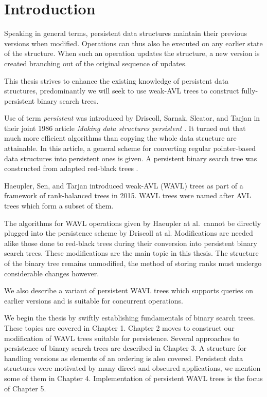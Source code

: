\chapter*{Introduction}

Speaking in general terms, persistent data structures maintain their previous versions when modified. Operations can thus also be executed on any earlier state of the structure. When such an operation updates the structure, a new version is created branching out of the original sequence of updates.

This thesis strives to enhance the existing knowledge of persistent data structures, predominantly we will seek to use weak-AVL trees to construct fully-persistent binary search trees.

Use of term \emph{persistent} was introduced by Driscoll, Sarnak, Sleator, and Tarjan in their joint 1986 article \emph{Making data structures persistent} \cite{persistence-DSST}. It turned out that much more efficient algorithms than copying the whole data structure are attainable. In this article, a general scheme for converting regular pointer-based data structures into persistent ones is given. A persistent binary search tree was constructed from adapted red-black trees \cite{red-black-trees}.

Haeupler, Sen, and Tarjan \cite{weight-balanced} introduced weak-AVL (WAVL) trees as part of a framework of rank-balanced trees in 2015. WAVL trees were named after AVL trees which form a subset of them.

The algorithms for WAVL operations given by Haeupler at al.~cannot be directly plugged into the persistence scheme by Driscoll at al. Modifications are needed alike those done to red-black trees during their conversion into persistent binary search trees. These modifications are the main topic in this thesis. The structure of the binary tree remains unmodified, the method of storing ranks must undergo considerable changes however.

We also describe a variant of persistent WAVL trees which supports queries on earlier versions and is suitable for concurrent operations.

We begin the thesis by swiftly establishing fundamentals of binary search trees. These topics are covered in Chapter 1. Chapter 2 moves to construct our modification of WAVL trees suitable for persistence. Several approaches to persistence of binary search trees are described in Chapter 3. A structure for handling versions as elements of an ordering is also covered. Persistent data structures were motivated by many direct and obscured applications, we mention some of them in Chapter 4. Implementation of persistent WAVL trees is the focus of Chapter 5.

